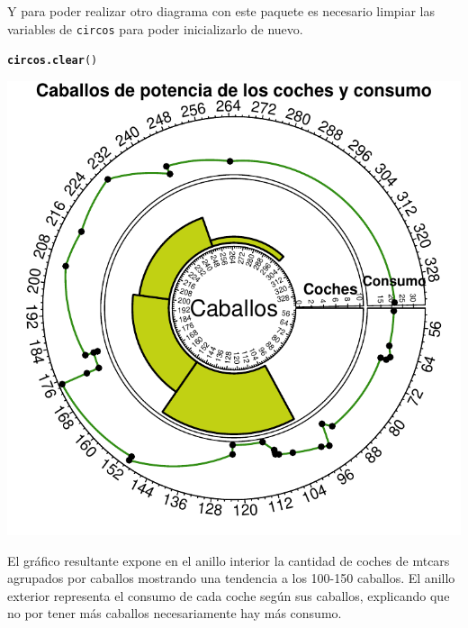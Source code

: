 \documentclass{article}\usepackage[]{graphicx}\usepackage[]{color}
\makeatletter
\def\maxwidth{ %
  \ifdim\Gin@nat@width>\linewidth
    \linewidth
  \else
    \Gin@nat@width
  \fi
}
\newcommand{\hlstd}[1]{\textcolor[rgb]{0.345,0.345,0.345}{#1}}%
\newcommand{\hlkwd}[1]{\textcolor[rgb]{0.737,0.353,0.396}{\textbf{#1}}}%
\newenvironment{kframe}{%
 \def\at@end@of@kframe{}%
 \ifinner\ifhmode%
  \def\at@end@of@kframe{\end{minipage}}%
  \begin{minipage}{\columnwidth}%
 \fi\fi%
 \def\FrameCommand##1{\hskip\@totalleftmargin \hskip-\fboxsep
 \colorbox{shadecolor}{##1}\hskip-\fboxsep
     \hskip-\linewidth \hskip-\@totalleftmargin \hskip\columnwidth}%
 \MakeFramed {\advance\hsize-\width
   \@totalleftmargin\z@ \linewidth\hsize
   \@setminipage}}%
 {\par\unskip\endMakeFramed%
 \at@end@of@kframe}
\newenvironment{knitrout}{}{} %
\makeatother
\begin{document}
Y para poder realizar otro diagrama con este paquete es necesario limpiar las variables de \texttt{circos} para poder inicializarlo de nuevo.
\begin{knitrout}
\color{fgcolor}\begin{kframe}
\begin{alltt}
\hlkwd{circos.clear}\hlstd{()}
\end{alltt}
\end{kframe}
\end{knitrout}
\begin{knitrout}
\color{fgcolor}

{\centering \includegraphics[width=\maxwidth]{figure/plot_ring_cir-1} 

}



\end{knitrout}
El gr\'afico resultante expone en el anillo interior la cantidad de coches de mtcars agrupados por caballos mostrando una tendencia a los 100-150 caballos. El anillo exterior representa el consumo de cada coche seg\'un sus caballos, explicando que no por tener m\'as caballos necesariamente hay m\'as consumo. 
\clearpage
\end{document}

